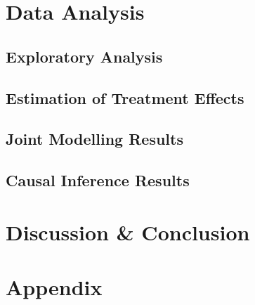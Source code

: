 \documentclass[a4paper,12pt]{article}\usepackage[]{graphicx}\usepackage[]{color}
\begin{document}
\section{Data Analysis}
\subsection{Exploratory Analysis}

\subsection{Estimation of Treatment Effects}

\subsection{Joint Modelling Results}

\subsection{Causal Inference Results}

\section{Discussion \& Conclusion}





\section*{Appendix}
\end{document}
